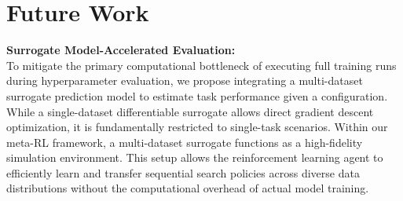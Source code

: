 \section{Future Work}
\label{section:future_work}

\textbf{Surrogate Model-Accelerated Evaluation:} \\
To mitigate the primary computational bottleneck of executing full training runs during hyperparameter evaluation, we propose integrating a multi-dataset surrogate prediction model to estimate task performance given a configuration. While a single-dataset differentiable surrogate allows direct gradient descent optimization, it is fundamentally restricted to single-task scenarios. Within our meta-RL framework, a multi-dataset surrogate functions as a high-fidelity simulation environment. This setup allows the reinforcement learning agent to efficiently learn and transfer sequential search policies across diverse data distributions without the computational overhead of actual model training.